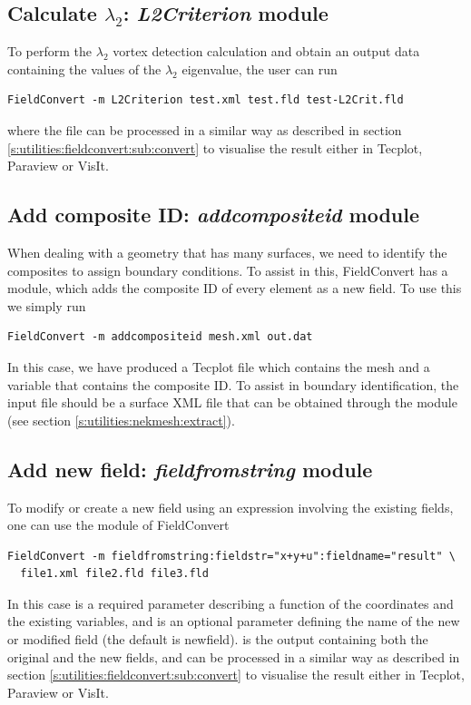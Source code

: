 \subsection{Calculate $\lambda_2$: \textit{L2Criterion} module}
To perform the $\lambda_2$ vortex detection calculation and obtain an output
data containing the values of the $\lambda_2$ eigenvalue, the user can run
%
\begin{lstlisting}[style=BashInputStyle]
  FieldConvert -m L2Criterion test.xml test.fld test-L2Crit.fld
\end{lstlisting}
%
where the file  can be processed in a similar
way as described in section \ref{s:utilities:fieldconvert:sub:convert}
to visualise the result either in Tecplot, Paraview or VisIt.
%
%
%

\subsection{Add composite ID: \textit{addcompositeid} module}
When dealing with a geometry that has many surfaces, we need to identify the
composites to assign boundary conditions. To assist in this, FieldConvert has a
 module, which adds the composite ID of every element as a
new field. To use this we simply run
%
\begin{lstlisting}[style=BashInputStyle]
  FieldConvert -m addcompositeid mesh.xml out.dat
\end{lstlisting}
%
In this case, we have produced a Tecplot file which contains the mesh and a
variable that contains the composite ID. To assist in boundary identification,
the input file  should be a surface XML file that can be
obtained through the \nm {} module (see section
\ref{s:utilities:nekmesh:extract}).
%
%
%
\subsection{Add new field: \textit{fieldfromstring} module}
To modify or create a new field using an expression involving the existing fields, one can
use the  module of FieldConvert
%
\begin{lstlisting}[style=BashInputStyle]
  FieldConvert -m fieldfromstring:fieldstr="x+y+u":fieldname="result" \
  file1.xml file2.fld file3.fld
\end{lstlisting}
%
In this case  is a required parameter describing a function of
the coordinates and the existing variables, and \inltt{fieldname} is an optional
parameter defining the name of the new or modified field (the default is newfield).
\inltt{file3.fld} is the output containing both the original and the new fields,
and can be processed in a similar way as described
in section \ref{s:utilities:fieldconvert:sub:convert} to visualise
the result either in Tecplot, Paraview or VisIt.
%
%
%
